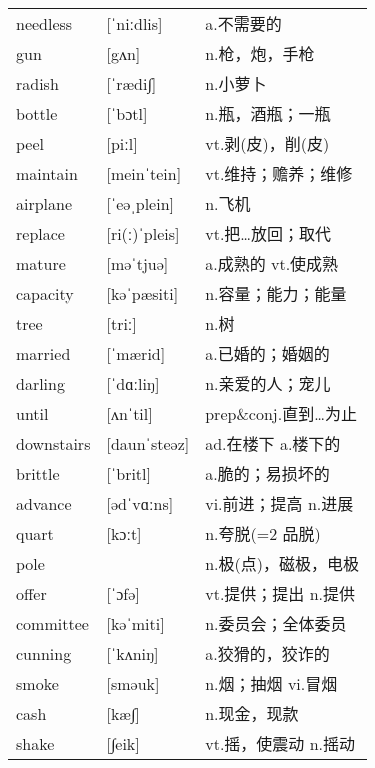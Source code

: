 \documentclass[a4paper]{article}
\begin{document}
\section{}
\begin{tabular}{l l l}

needless & [ˈniːdlis] & a.不需要的 \\
gun & [gʌn] & n.枪，炮，手枪 \\
radish & [ˈrædi∫] & n.小萝卜 \\
bottle & [ˈbɔtl] & n.瓶，酒瓶；一瓶 \\
peel & [piːl] & vt.剥(皮)，削(皮) \\
maintain & [meinˈtein] & vt.维持；赡养；维修 \\
airplane & [ˈeəˌplein] & n.飞机 \\
replace & [ri(ː)ˈpleis] & vt.把…放回；取代 \\
mature & [məˈtjuə] & a.成熟的 vt.使成熟 \\
capacity & [kəˈpæsiti] & n.容量；能力；能量 \\
tree & [triː] & n.树 \\
married & [ˈmærid] & a.已婚的；婚姻的 \\
darling & [ˈdɑːliŋ] & n.亲爱的人；宠儿 \\
until & [ʌnˈtil] & prep\&conj.直到…为止 \\
downstairs & [daunˈsteəz] & ad.在楼下 a.楼下的 \\
brittle & [ˈbritl] & a.脆的；易损坏的 \\
advance & [ədˈvɑːns] & vi.前进；提高 n.进展 \\
quart & [kɔːt] & n.夸脱(=2 品脱) \\
pole &  & n.极(点)，磁极，电极 \\
offer & [ˈɔfə] & vt.提供；提出 n.提供 \\
committee & [kəˈmiti] & n.委员会；全体委员 \\
cunning & [ˈkʌniŋ] & a.狡猾的，狡诈的 \\
smoke & [sməuk] & n.烟；抽烟 vi.冒烟 \\
cash & [kæ∫] & n.现金，现款 \\
shake & [∫eik] & vt.摇，使震动 n.摇动 \\

\end{tabular}
\end{document}
